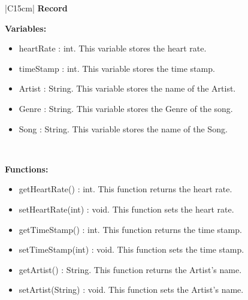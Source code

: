 \documentclass[letterpaper,english, 12pt]{scrreprt}
\begin{document}
\begin{center}
        \begin{tabular}{|C{15cm}|}
                \hline
                        \textbf{Record} \\
                \hline
                        \begin{flushleft}
                                \textbf{Variables: }\\
                        \end{flushleft}
                                \begin{itemize}
                                        \item heartRate : int. This variable stores the heart rate.
                                        \item timeStamp : int. This variable stores the time stamp.
                                        \item Artist : String. This variable stores the name of the Artist.
                                        \item Genre : String. This variable stores the Genre of the song.
                                        \item Song : String. This variable stores the name of the Song.
                                \end{itemize} \\
 \hline
                        \begin{flushleft}
                                \textbf{Functions: } \\
                        \end{flushleft}
                                \begin{itemize}
                                        \item getHeartRate() : int. This function returns the heart rate.
                                        \item setHeartRate(int) : void. This function sets the heart rate.
                                        \item getTimeStamp() : int. This function returns the time stamp.
                                        \item setTimeStamp(int) : void. This function sets the time stamp.
                                        \item getArtist() : String. This function returns the Artist's name.
                                        \item setArtist(String) : void. This function sets the Artist's name.

\end{itemize}
\end{tabular}
\end{center}
\end{document}
